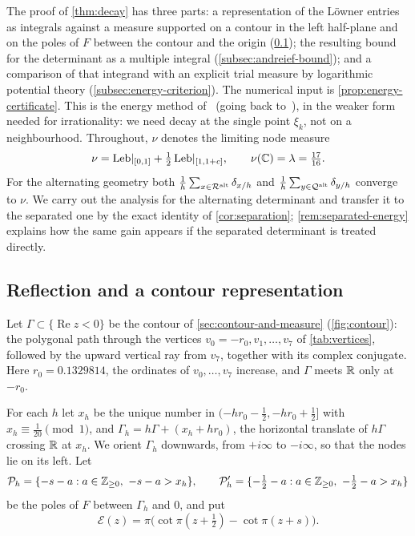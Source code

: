 The proof of \cref{thm:decay} has three parts: a representation of the L\"owner entries as
integrals against a measure supported on a contour in the left half-plane and on the poles of $F$
between the contour and the origin (\cref{subsec:contour}); the resulting bound for the
determinant as a multiple integral (\cref{subsec:andreief-bound}); and a comparison of that
integrand with an explicit trial measure by logarithmic potential theory
(\cref{subsec:energy-criterion}). The numerical input is \cref{prop:energy-certificate}. This is
the energy method of~\cite[\S6]{Litsey2026Lowner} (going back to~\cite{OpenAICatalan2026}), in
the weaker form needed for irrationality: we need decay at the single point $\xi_k$, not on a
neighbourhood. Throughout, $\nu$ denotes the limiting node measure
\begin{equation}\label{eq:nu-def}
  \nu=\mathrm{Leb}|_{[0,1]}+\tfrac12\,\mathrm{Leb}|_{[1,1+c]},\qquad \nu(\mathbb{C})=\lambda=\tfrac{17}{16}.
\end{equation}
For the alternating geometry both $\frac1h\sum_{x\in\mathcal{R}^{\mathrm{alt}}}\delta_{x/h}$ and
$\frac1h\sum_{y\in\mathcal{Q}^{\mathrm{alt}}}\delta_{y/h}$ converge to $\nu$. We carry out the analysis for the
alternating determinant and transfer it to the separated one by the exact identity of
\cref{cor:separation}; \cref{rem:separated-energy} explains how the same gain appears if the
separated determinant is treated directly.

\subsection{Reflection and a contour representation}\label{subsec:contour}

Let $\Gamma\subset\{\operatorname{Re}z<0\}$ be the contour of \cref{sec:contour-and-measure}
(\cref{fig:contour}): the polygonal path through the vertices $v_0=-r_0,v_1,\dots,v_7$ of
\cref{tab:vertices}, followed by the upward vertical ray from $v_7$, together with its complex
conjugate. Here $r_0=0.1329814$, the ordinates of $v_0,\dots,v_7$ increase, and $\Gamma$ meets
$\mathbb{R}$ only at $-r_0$.

For each $h$ let $x_h$ be the unique number in $(-hr_0-\frac12,-hr_0+\frac12]$ with
$x_h\equiv\frac1{20}\pmod1$, and $\Gamma_h=h\Gamma+(x_h+hr_0)$, the horizontal translate of
$h\Gamma$ crossing $\mathbb{R}$ at $x_h$. We orient $\Gamma_h$ downwards, from $+i\infty$ to $-i\infty$,
so that the nodes lie on its left. Let
\[
  \Atoms_h=\{-s-a:a\in\Z_{\ge0},\ -s-a>x_h\},\qquad
  \Atoms_h'=\{-\tfrac12-a:a\in\Z_{\ge0},\ -\tfrac12-a>x_h\}
\]
be the poles of $F$ between $\Gamma_h$ and $0$, and put
\[
  \mathcal E(z)=\pi\bigl(\cot\pi(z+\tfrac12)-\cot\pi(z+s)\bigr).
\]


